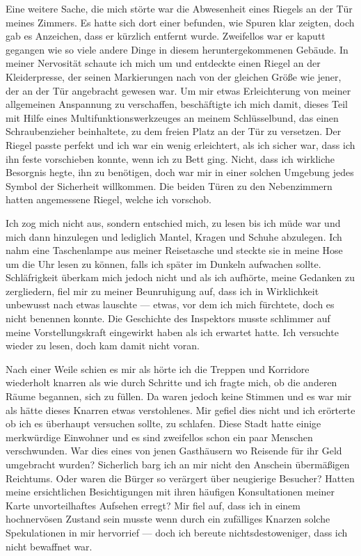 Eine weitere Sache, die mich störte war die Abwesenheit eines Riegels an der Tür meines Zimmers. Es hatte sich dort einer befunden, wie Spuren klar zeigten, doch gab es Anzeichen, dass er kürzlich entfernt wurde. Zweifellos war er kaputt gegangen wie so viele andere Dinge in diesem heruntergekommenen Gebäude. In meiner Nervosität schaute ich mich um und entdeckte einen Riegel an der Kleiderpresse, der seinen Markierungen nach von der gleichen Größe wie jener, der an der Tür angebracht gewesen war. Um mir etwas Erleichterung von meiner allgemeinen Anspannung zu verschaffen, beschäftigte ich mich damit, dieses Teil mit Hilfe eines Multifunktionswerkzeuges an meinem Schlüsselbund, das einen Schraubenzieher beinhaltete, zu dem freien Platz an der Tür zu versetzen. Der Riegel passte perfekt und ich war ein wenig erleichtert, als ich sicher war, dass ich ihn feste vorschieben konnte, wenn ich zu Bett ging. Nicht, dass ich wirkliche Besorgnis hegte, ihn zu benötigen, doch war mir in einer solchen Umgebung jedes Symbol der Sicherheit willkommen. Die beiden Türen zu den Nebenzimmern hatten angemessene Riegel, welche ich vorschob.

Ich zog mich nicht aus, sondern entschied mich, zu lesen bis ich müde war und mich dann hinzulegen und lediglich Mantel, Kragen und Schuhe abzulegen. Ich nahm eine Taschenlampe aus meiner Reisetasche und steckte sie in meine Hose um die Uhr lesen zu können, falls ich später im Dunkeln aufwachen sollte. Schläfrigkeit überkam mich jedoch nicht und als ich aufhörte, meine Gedanken zu zergliedern, fiel mir zu meiner Beunruhigung auf, dass ich in Wirklichkeit unbewusst nach etwas lauschte --- etwas, vor dem ich mich fürchtete, doch es nicht benennen konnte. Die Geschichte des Inspektors musste schlimmer auf meine Vorstellungskraft eingewirkt haben als ich erwartet hatte. Ich versuchte wieder zu lesen, doch kam damit nicht voran.

Nach einer Weile schien es mir als hörte ich die Treppen und Korridore wiederholt knarren als wie durch Schritte und ich fragte mich, ob die anderen Räume begannen, sich zu füllen. Da waren jedoch keine Stimmen und es war mir als hätte dieses Knarren etwas verstohlenes. Mir gefiel dies nicht und ich erörterte ob ich es überhaupt versuchen sollte, zu schlafen. Diese Stadt hatte einige merkwürdige Einwohner und es sind zweifellos schon ein paar Menschen verschwunden. War dies eines von jenen Gasthäusern wo Reisende für ihr Geld umgebracht wurden? Sicherlich barg ich an mir nicht den Anschein übermäßigen Reichtums. Oder waren die Bürger so verärgert über neugierige Besucher? Hatten meine ersichtlichen Besichtigungen mit ihren häufigen Konsultationen meiner Karte unvorteilhaftes Aufsehen erregt? Mir fiel auf, dass ich in einem hochnervösen Zustand sein musste wenn durch ein zufälliges Knarzen solche Spekulationen in mir hervorrief --- doch ich bereute nichtsdestoweniger, dass ich nicht bewaffnet war.

